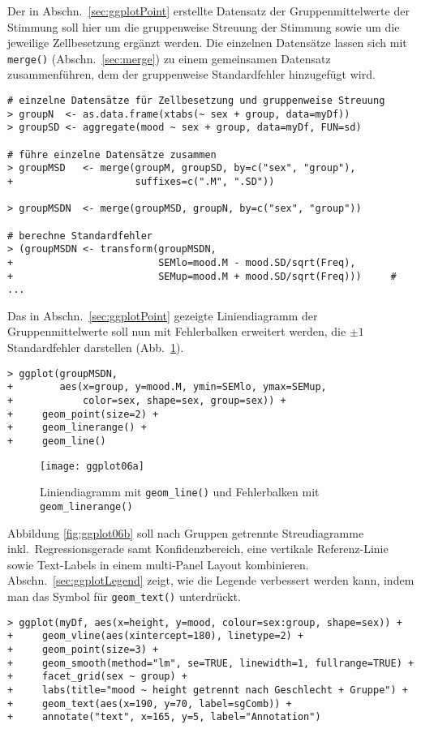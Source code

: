 Der in Abschn.\ \ref{sec:ggplotPoint} erstellte Datensatz der Gruppenmittelwerte der Stimmung soll hier um die gruppenweise Streuung der Stimmung sowie um die jeweilige Zellbesetzung ergänzt werden. Die einzelnen Datensätze lassen sich mit \lstinline!merge()! (Abschn.\ \ref{sec:merge}) zu einem gemeinsamen Datensatz zusammenführen, dem der gruppenweise Standardfehler hinzugefügt wird.
\begin{lstlisting}
# einzelne Datensätze für Zellbesetzung und gruppenweise Streuung
> groupN  <- as.data.frame(xtabs(~ sex + group, data=myDf))
> groupSD <- aggregate(mood ~ sex + group, data=myDf, FUN=sd)

# führe einzelne Datensätze zusammen
> groupMSD   <- merge(groupM, groupSD, by=c("sex", "group"),
+                     suffixes=c(".M", ".SD"))

> groupMSDN  <- merge(groupMSD, groupN, by=c("sex", "group"))

# berechne Standardfehler
> (groupMSDN <- transform(groupMSDN,
+                         SEMlo=mood.M - mood.SD/sqrt(Freq),
+                         SEMup=mood.M + mood.SD/sqrt(Freq)))     # ...
\end{lstlisting}

Das in Abschn.\ \ref{sec:ggplotPoint} gezeigte Liniendiagramm der Gruppenmittelwerte soll nun mit Fehlerbalken erweitert werden, die $\pm 1$ Standardfehler darstellen (Abb.\ \ref{fig:ggplot6a}).
\begin{lstlisting}
> ggplot(groupMSDN,
+        aes(x=group, y=mood.M, ymin=SEMlo, ymax=SEMup,
+            color=sex, shape=sex, group=sex)) +
+     geom_point(size=2) +
+     geom_linerange() +
+     geom_line()
\end{lstlisting}

\begin{figure}[ht]
\centering
\texttt{[image: ggplot06a]}
\vspace*{-0.5em}
\caption{Liniendiagramm mit \lstinline!geom_line()! und Fehlerbalken mit \lstinline!geom_linerange()!}
\label{fig:ggplot6a}
\end{figure}

Abbildung \ref{fig:ggplot06b} soll nach Gruppen getrennte Streudiagramme inkl.\ Regressionsgerade samt Konfidenzbereich, eine vertikale Referenz-Linie sowie Text-Labels in einem multi-Panel Layout kombinieren. Abschn.\ \ref{sec:ggplotLegend} zeigt, wie die Legende verbessert werden kann, indem man das Symbol für \lstinline!geom_text()! unterdrückt.
\begin{lstlisting}
> ggplot(myDf, aes(x=height, y=mood, colour=sex:group, shape=sex)) +
+     geom_vline(aes(xintercept=180), linetype=2) +
+     geom_point(size=3) +
+     geom_smooth(method="lm", se=TRUE, linewidth=1, fullrange=TRUE) +
+     facet_grid(sex ~ group) +
+     labs(title="mood ~ height getrennt nach Geschlecht + Gruppe") +
+     geom_text(aes(x=190, y=70, label=sgComb)) +
+     annotate("text", x=165, y=5, label="Annotation")
\end{lstlisting}

